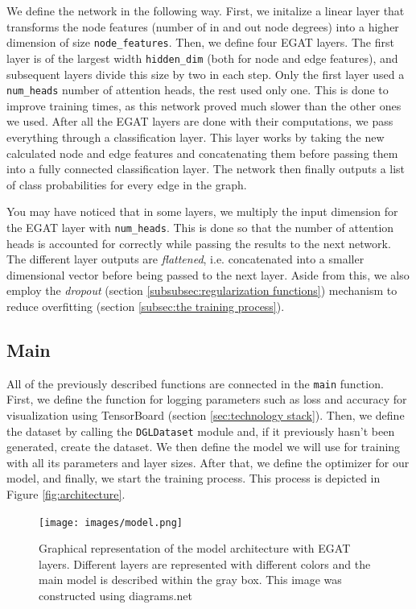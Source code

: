\documentclass[times, utf8, diplomski, english]{fer_eng}
\begin{document}
We define the network in the following way. First, we initalize a linear layer that transforms the node features (number of in and out node degrees) into a higher dimension of size \texttt{node\_features}. Then, we define four EGAT layers. The first layer is of the largest width \texttt{hidden\_dim} (both for node and edge features), and subsequent layers divide this size by two in each step. Only the first layer used a \texttt{num\_heads} number of attention heads, the rest used only one. This is done to improve training times, as this network proved much slower than the other ones we used. After all the EGAT layers are done with their computations, we pass everything through a classification layer. This layer works by taking the new calculated node and edge features and concatenating them before passing them into a fully connected classification layer. The network then finally outputs a list of class probabilities for every edge in the graph.

You may have noticed that in some layers, we multiply the input dimension for the EGAT layer with \texttt{num\_heads}. This is done so that the number of attention heads is accounted for correctly while passing the results to the next network. The different layer outputs are \textit{flattened}, i.e. concatenated into a smaller dimensional vector before being passed to the next layer. Aside from this, we also employ the \textit{dropout} (section \ref{subsubsec:regularization functions}) mechanism to reduce overfitting (section \ref{subsec:the training process}).

\subsection{Main}

All of the previously described functions are connected in the \texttt{main} function. First, we define the function for logging parameters such as loss and accuracy for visualization using TensorBoard (section \ref{sec:technology stack}). Then, we define the dataset by calling the \texttt{DGLDataset} module and, if it previously hasn't been generated, create the dataset. We then define the model we will use for training with all its parameters and layer sizes. After that, we define the optimizer for our model, and finally, we start the training process. This process is depicted in Figure \ref{fig:architecture}.

\begin{figure}[h]
	\centering
	\texttt{[image: images/model.png]}
	\caption[Model]{Graphical representation of the model architecture with EGAT layers. Different layers are represented with different colors and the main model is described within the gray box. This image was constructed using diagrams.net\footnotemark{}}
	\label{fig:model}
\end{figure}
\end{document}

